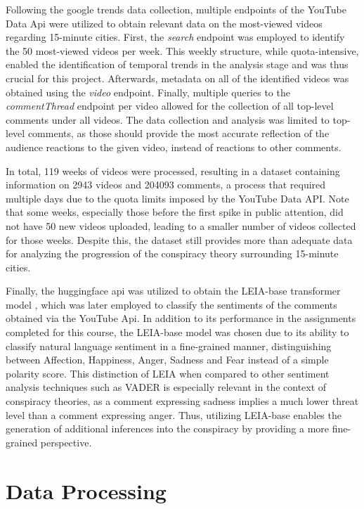 \documentclass[fontsize=11pt, parskip=half]{scrartcl}
\begin{document}
    Following the google trends data collection, multiple endpoints of the YouTube Data Api were utilized to obtain relevant data on the most-viewed videos regarding 15-minute cities. First, the \textit{search} endpoint was employed to identify the 50 most-viewed videos per week. This weekly structure, while quota-intensive, enabled the identification of temporal trends in the analysis stage and was thus crucial for this project. Afterwards, metadata on all of the identified videos was obtained using the \textit{video} endpoint. Finally, multiple queries to the \textit{commentThread} endpoint per video allowed for the collection of all top-level comments under all videos. The data collection and analysis was limited to top-level comments, as those should provide the most accurate reflection of the audience reactions to the given video, instead of reactions to other comments.
    
    In total, 119 weeks of videos were processed, resulting in a dataset containing information on 2943 videos and 204093 comments, a process that required multiple days due to the quota limits imposed by the YouTube Data API. Note that some weeks, especially those before the first spike in public attention, did not have 50 new videos uploaded, leading to a smaller number of videos collected for those weeks. Despite this, the dataset still provides more than adequate data for analyzing the progression of the conspiracy theory surrounding 15-minute cities. 

    Finally, the huggingface api was utilized to obtain the LEIA-base transformer model \parencite{aroyehunLEIALinguisticEmbeddings2023}, which was later employed to classify the sentiments of the comments obtained via the YouTube Api. In addition to its performance in the assignments completed for this course, the LEIA-base model was chosen due to its ability to classify natural language sentiment in a fine-grained manner, distinguishing between Affection, Happiness, Anger, Sadness and Fear instead of a simple polarity score. This distinction of LEIA when compared to other sentiment analysis techniques such as VADER \parencite{cjhuttoVaderSentiment2020} is especially relevant in the context of conspiracy theories, as a comment expressing sadness implies a much lower threat level than a comment expressing anger. Thus, utilizing LEIA-base enables the generation of additional inferences into the conspiracy by providing a more fine-grained perspective.

\section{Data Processing}
\label{section:processing}
\end{document}
